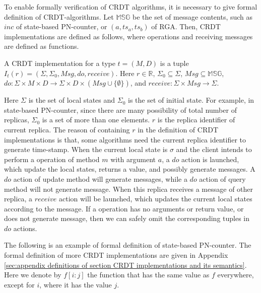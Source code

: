 To enable formally verification of CRDT algorithms, it is necessary to give formal definition of CRDT-algorithms. Let $\mathbb{MSG}$ be the set of message contents, such as $inc$ of state-based PN-counter, or $(a,ts_a,ts_b)$ of RGA. Then, CRDT implementations are defined as follows, where operations and receiving messages are defined as functions. 

\begin{definition}
\label{definition:CRDT implementations}
A CRDT implementation for a type $t = (M,D)$ is a tuple $I_t(r) = (\Sigma, \Sigma_0, \mathit{Msg}, \mathit{do},\mathit{receive})$. Here $r \in \mathbb{R}$, $\Sigma_0 \subseteq \Sigma$, $\mathit{Msg} \subseteq \mathbb{MSG}$, $\mathit{do}:\Sigma \times M \times D \rightarrow \Sigma \times D \times (\mathit{Msg} \cup \{ \emptyset \} )$, and $\mathit{receive}: \Sigma \times \mathit{Msg} \rightarrow \Sigma$.
\end{definition}

Here $\Sigma$ is the set of local states and $\Sigma_0$ is the set of initial state. For example, in state-based PN-counter, since there are many possibility of total number of replicas, $\Sigma_0$ is a set of more than one elements. $r$ is the replica identifier of current replica. The reason of containing $r$ in the definition of CRDT implementations is that, some algorithms need the current replica identifier to generate time-stamp. When the current local state is $\sigma$ and the client intends to perform a operation of method $m$ with argument $a$, a $\mathit{do}$ action is launched, which update the local states, returns a value, and possibly generate messages. A $\mathit{do}$ action of update method will generate messages, while a $\mathit{do}$ action of query method will not generate message. When this replica receives a message of other replica, a $\mathit{receive}$ action will be launched, which updates the current local states according to the message. If a operation has no arguments or return value, or does not generate message, then we can safely omit the corresponding tuples in $\mathit{do}$ actions.

The following is an example of formal definition of state-based PN-counter. The formal definition of more CRDT implementations are given in Appendix \ref{sec:appendix definitions of section CRDT implementations and its semantics}. Here we denote by $f[i:j]$ the function that has the same value as $f$ everywhere, except for $i$, where it has the value $j$. 

